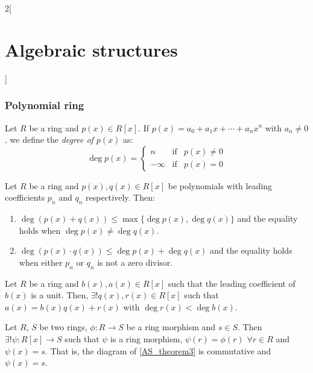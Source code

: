 \documentclass[../../../main.tex]{subfiles}
\begin{document}
\begin{multicols}{2}[\section{Algebraic structures}]
    \subsubsection{Polynomial ring}
    \begin{definition}
        Let $R$ be a ring and $p(x)\in R[x]$. If $p(x)=a_0+a_1x+\cdots+a_nx^n$ with $a_n\ne 0$, we define the \textit{degree of $p(x)$} as:
        \begin{equation*}
            \deg p(x)=\left\{
            \begin{array}{ccc}
                n       & \text{if} & p(x)\ne 0 \\
                -\infty & \text{if} & p(x)= 0
            \end{array}\right.
        \end{equation*}
    \end{definition}
    \begin{prop}\label{AS_deg}
        Let $R$ be a ring and $p(x),q(x)\in R[x]$ be polynomials with leading coefficients $p_n$ and $q_n$ respectively. Then:
        \begin{enumerate}
            \item $\deg(p(x)+q(x))\leq\max\{\deg p(x),\deg q(x)\}$ and the equality holds when $\deg p(x)\ne\deg q(x)$.
            \item $\deg(p(x)\cdot q(x))\leq\deg p(x)+\deg q(x)$ and the equality holds when either $p_n$ or $q_n$ is not a zero divisor.
        \end{enumerate}
    \end{prop}
    \begin{prop}
        Let $R$ be a ring and $b(x),a(x)\in R[x]$ such that the leading coefficient of $b(x)$ is a unit. Then, $\exists! q(x),r(x)\in R[x]$ such that $a(x)=b(x)q(x)+r(x)$ with $\deg r(x)<\deg b(x)$.
    \end{prop}
    \begin{prop}
        Let $R$, $S$ be two rings, $\phi:R\rightarrow S$ be a ring morphism and $s\in S$. Then $\exists!\psi:R[x]\rightarrow S$ such that $\psi$ is a ring morphism, $\psi(r)=\phi(r)$ $\forall r\in R$ and $\psi(x)=s$. That is, the diagram of \cref{AS_theorem3} is commutative and $\psi(x)=s$.
        \begin{center}
            \begin{minipage}{\linewidth}
                \centering
                

\end{minipage}
\end{center}
\end{prop}
\end{multicols}
\end{document}
